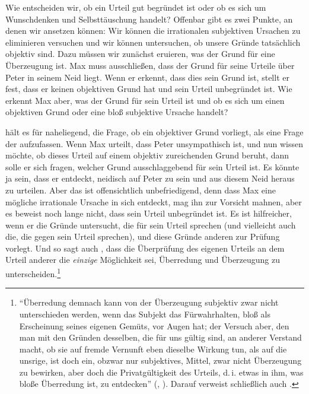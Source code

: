 Wie entscheiden wir, ob ein Urteil gut begründet ist oder ob es sich um
Wunschdenken und Selbsttäuschung handelt? Offenbar gibt es zwei Punkte, an denen
wir ansetzen können: Wir können die irrationalen subjektiven Ursachen zu eliminieren
versuchen und wir können untersuchen, ob unsere Gründe tatsächlich objektiv sind.
Dazu müssen wir zunächst eruieren, was der  Grund für eine
Überzeugung ist. Max muss ausschließen, dass der Grund für seine Urteile über
Peter in seinem Neid liegt. Wenn er erkennt, dass dies sein Grund ist, stellt er
fest, dass er keinen objektiven Grund hat und sein Urteil unbegründet ist. Wie
erkennt Max aber, was der Grund für sein Urteil ist und ob es sich um einen
objektiven Grund oder eine bloß subjektive Ursache handelt?

 hält es
für naheliegend, die Frage, ob ein objektiver Grund vorliegt, als eine Frage der
 aufzufassen. Wenn Max urteilt, dass Peter unsympathisch ist, und nun wissen
möchte, ob dieses Urteil auf einem objektiv zureichenden Grund beruht, dann
solle er sich fragen, welcher Grund ausschlaggebend für sein Urteil ist. Es
könnte ja sein, dass er entdeckt, neidisch auf Peter zu sein und aus diesem
Neid heraus zu urteilen. Aber das ist offensichtlich
unbefriedigend, denn dass Max eine mögliche irrationale Ursache in sich
entdeckt, mag ihn zur Vorsicht mahnen, aber es beweist noch lange nicht, dass
sein Urteil unbegründet ist. Es ist hilfreicher, wenn er die Gründe untersucht,
die für sein Urteil sprechen (und vielleicht auch die, die gegen sein Urteil
sprechen), und diese Gründe anderen zur Prüfung vorlegt. Und so sagt auch
, dass die Überprüfung des eigenen Urteils an dem Urteil
anderer die \emph{einzige} Möglichkeit sei, Überredung und Überzeugung zu
unterscheiden.\footnote{\enquote{Überredung demnach kann von der Überzeugung
subjektiv zwar nicht unterschieden werden, wenn das Subjekt das Fürwahrhalten,
bloß als Erscheinung seines eigenen Gemüts, vor Augen hat; der Versuch aber,
den man mit den Gründen desselben, die für uns gültig sind, an anderer
Verstand macht, ob sie auf fremde Vernunft eben dieselbe Wirkung tun, als auf
die unsrige, ist doch ein, obzwar nur subjektives, Mittel, zwar nicht
Überzeugung zu bewirken, aber doch die Privatgültigkeit des Urteils, d.\,i.
etwas in ihm, was bloße Überredung ist, zu entdecken} \mkbibparens{\cite[][B
849]{Kant:KritikderreinenVernunft2003}, \cite[][III:
532.17--24]{Kant:GesammelteWerke1900ff.}}. Darauf verweist schließlich auch
\textcite[vgl.][79]{Stevenson:OpinionBelieforFaithandKnowledge2003}.}

